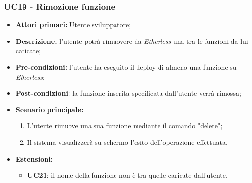 \subsubsection{UC19 - Rimozione funzione}
\begin{itemize}
	\item \textbf{Attori primari:} Utente sviluppatore;
	\item \textbf{Descrizione:} l'utente potrà rimuovere da \textit{Etherless} una tra le funzioni da lui caricate;
	\item \textbf{Pre-condizioni:} l'utente ha eseguito il deploy di almeno una funzione su \textit{Etherless};
	\item \textbf{Post-condizioni:} la funzione inserita specificata dall'utente verrà rimossa;
	\item \textbf{Scenario principale:}
	\begin{enumerate}
		\item L'utente rimuove una sua funzione mediante il comando "delete";
		\item Il sistema visualizzerà su schermo l'esito dell'operazione effettuata.
	\end{enumerate}
	\item\textbf{Estensioni:}
	\begin{itemize}
 		\item \textbf{UC21}: il nome della funzione non è tra quelle caricate dall'utente.
	\end{itemize}
\end{itemize}

